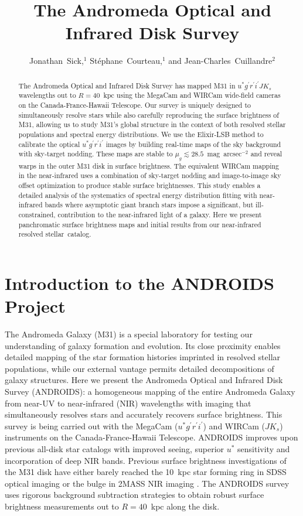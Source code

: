 \documentclass[11pt,twoside]{article}
\begin{document}
\title{The Andromeda Optical and Infrared Disk Survey}
\author{Jonathan~Sick,$^1$ St\'{e}phane~Courteau,$^1$ and Jean-Charles~Cuillandre$^2$}

\begin{abstract}
The Andromeda Optical and Infrared Disk Survey has mapped M31 in $u^* g^\prime r^\prime i^\prime J K_s$ wavelengths out to $R=40$~kpc using the MegaCam and WIRCam wide-field cameras on the Canada-France-Hawaii Telescope.
Our survey is uniquely designed to simultaneously resolve stars while also carefully reproducing the surface brightness of M31, allowing us to study M31's global structure in the context of both resolved stellar populations and spectral energy distributions.
We use the Elixir-LSB method to calibrate the optical $u^* g^\prime r^\prime i^\prime$ images by building real-time maps of the sky background with sky-target nodding.
These maps are stable to $\mu_g \lesssim 28.5$~mag~arcsec$^{-2}$ and reveal warps in the outer M31 disk in surface brightness.
The equivalent WIRCam mapping in the near-infrared uses a combination of sky-target nodding and image-to-image sky offset optimization to produce stable surface brightnesses.
This study enables a detailed analysis of the systematics of spectral energy distribution fitting with near-infrared bands where asymptotic giant branch stars impose a significant, but ill-constrained, contribution to the near-infrared light of a galaxy.
Here we present panchromatic surface brightness maps and initial results from our near-infrared resolved stellar~catalog.
\end{abstract}

\section{Introduction to the ANDROIDS Project}

The Andromeda Galaxy (M31) is a special laboratory for testing our understanding of galaxy formation and evolution.
Its close proximity enables detailed mapping of the star formation histories imprinted in resolved stellar populations, while our external vantage permits detailed decompositions of galaxy structures.
Here we present the Andromeda Optical and Infrared Disk Survey (ANDROIDS): a homogeneous mapping of the entire Andromeda Galaxy from near-UV to near-infrared (NIR) wavelengths with imaging that simultaneously resolves stars and accurately recovers surface brightness.
This survey is being carried out with the MegaCam ($u^*g^\prime r^\prime i^\prime$) and WIRCam ($JK_s$) instruments on the Canada-France-Hawaii Telescope.
ANDROIDS improves upon previous all-disk star catalogs \citep[e.g., the Local Group Galaxy Survey;][]{Massey:2006} with improved seeing, superior $u^*$ sensitivity and incorporation of deep NIR bands.
Previous surface brightness investigations of the M31 disk have either barely reached the 10~kpc star forming ring in SDSS optical imaging \citep{Tamm:2012} or the bulge in 2MASS NIR imaging \cite{Beaton:2007}.
The ANDROIDS survey uses rigorous background subtraction strategies to obtain robust surface brightness measurements out to $R=40$~kpc along the disk.
\end{document}
